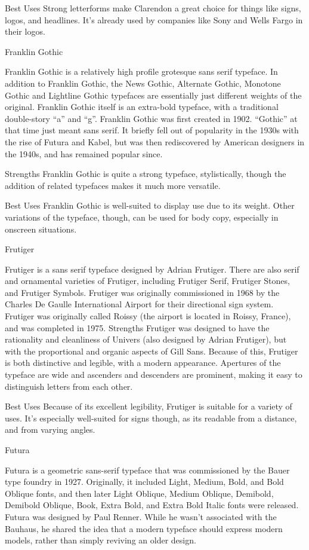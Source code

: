 \documentclass[12pt,a4paper,twocolumn]{book} %
\begin{document}
Best Uses
Strong letterforms make Clarendon a great choice for things like signs, logos, and headlines. It’s already used by companies like Sony and Wells Fargo in their logos.


Franklin Gothic

Franklin Gothic is a relatively high profile grotesque sans serif typeface. In addition to Franklin Gothic, the News Gothic, Alternate Gothic, Monotone Gothic and Lightline Gothic typefaces are essentially just different weights of the original. Franklin Gothic itself is an extra-bold typeface, with a traditional double-story “a” and “g”.
Franklin Gothic was first created in 1902. “Gothic” at that time just meant sans serif. It briefly fell out of popularity in the 1930s with the rise of Futura and Kabel, but was then rediscovered by American designers in the 1940s, and has remained popular since.

Strengths
Franklin Gothic is quite a strong typeface, stylistically, though the addition of related typefaces makes it much more versatile.

Best Uses
Franklin Gothic is well-suited to display use due to its weight. Other variations of the typeface, though, can be used for body copy, especially in onscreen situations.


Frutiger

Frutiger is a sans serif typeface designed by Adrian Frutiger. There are also serif and ornamental varieties of Frutiger, including Frutiger Serif, Frutiger Stones, and Frutiger Symbols. Frutiger was originally commissioned in 1968 by the Charles De Gaulle International Airport for their directional sign system. Frutiger was originally called Roissy (the airport is located in Roissy, France), and was completed in 1975.
Strengths
Frutiger was designed to have the rationality and cleanliness of Univers (also designed by Adrian Frutiger), but with the proportional and organic aspects of Gill Sans. Because of this, Frutiger is both distinctive and legible, with a modern appearance. Apertures of the typeface are wide and ascenders and descenders are prominent, making it easy to distinguish letters from each other.

Best Uses
Because of its excellent legibility, Frutiger is suitable for a variety of uses. It’s especially well-suited for signs though, as its readable from a distance, and from varying angles.


Futura

Futura is a geometric sans-serif typeface that was commissioned by the Bauer type foundry in 1927. Originally, it included Light, Medium, Bold, and Bold Oblique fonts, and then later Light Oblique, Medium Oblique, Demibold, Demibold Oblique, Book, Extra Bold, and Extra Bold Italic fonts were released.
Futura was designed by Paul Renner. While he wasn’t associated with the Bauhaus, he shared the idea that a modern typeface should express modern models, rather than simply reviving an older design.
\end{document}
